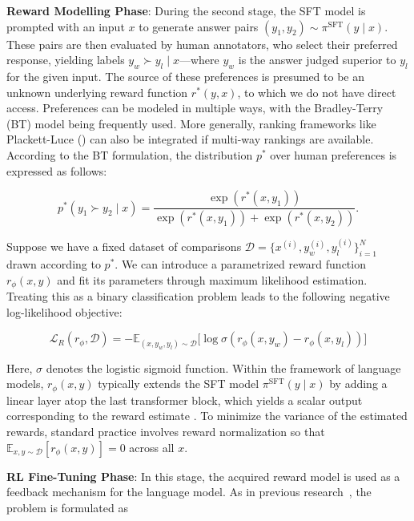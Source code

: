 \textbf{Reward Modelling Phase}: During the second stage, the SFT model is prompted with an input $x$ to generate answer pairs $(y_1, y_2)\sim \pi^\text{SFT}(y \mid x)$. These pairs are then evaluated by human annotators, who select their preferred response, yielding labels $y_w\succ y_l \mid x$—where $y_w$ is the answer judged superior to $y_l$ for the given input. The source of these preferences is presumed to be an unknown underlying reward function $r^*(y, x)$, to which we do not have direct access. Preferences can be modeled in multiple ways, with the Bradley-Terry (BT) model \cite{bradley1952rankanalysis} being frequently used. More generally, ranking frameworks like Plackett-Luce (\citep{plackett1975analysis, luce2012individual}) can also be integrated if multi-way rankings are available. According to the BT formulation, the distribution $p^*$ over human preferences is expressed as follows:

\begin{equation}\label{eq:bradley-terry}
    p^*(y_1\succ y_2 \mid x)=\frac{\exp\left(r^*(x, y_1)\right)}{\exp\left(r^*(x, y_1)\right) + \exp\left(r^*(x, y_2)\right)}.
\end{equation}

Suppose we have a fixed dataset of comparisons $\mathcal{D}=\bigl\{x^{(i)}, y_w^{(i)}, y_l^{(i)}\bigr\}_{i=1}^N$ drawn according to $p^*$. We can introduce a parametrized reward function $r_{\phi}(x, y)$ and fit its parameters through maximum likelihood estimation. Treating this as a binary classification problem leads to the following negative log-likelihood objective:

\begin{equation}\label{eq:reward_model}
    \mathcal{L}_R(r_{\phi}, \mathcal{D}) = -\mathbb{E}_{(x, y_w, y_l)\sim \mathcal{D}}\bigl[\log \sigma(r_{\phi}(x, y_w)- r_{\phi}(x, y_l))\bigr]
\end{equation}

Here, $\sigma$ denotes the logistic sigmoid function. Within the framework of language models, $r_{\phi}(x, y)$ typically extends the SFT model $\pi^\text{SFT}(y \mid x)$ by adding a linear layer atop the last transformer block, which yields a scalar output corresponding to the reward estimate \cite{ziegler2020finetuning}. To minimize the variance of the estimated rewards, standard practice involves reward normalization so that $\mathbb{E}_{x,y\sim \mathcal{D}}\left[r_\phi(x, y)\right] = 0$ across all $x$.

\textbf{RL Fine-Tuning Phase}: In this stage, the acquired reward model is used as a feedback mechanism for the language model. As in previous research~\citep{jaques2017sequence, jaques2020human}, the problem is formulated as

